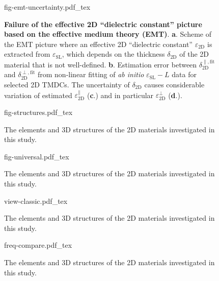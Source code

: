 \begin{figure}[!htbp]
  \centering
  {fig-emt-uncertainty.pdf_tex}
  \caption{\label{fig-emt}  \textbf{Failure of the effective 2D
      ``dielectric constant'' picture based on the effective medium
      theory (EMT)}. \textbf{a}.  Scheme of the EMT picture where an
    effective 2D ``dielectric constant'' $\varepsilon_{\mathrm{2D}}$
    is extracted from $\varepsilon_{\mathrm{SL}}$, which depends on
    the thickness $\delta_{\mathrm{2D}}$ of the 2D material that is
    not well-defined. \textbf{b}.  Estimation error between
    $\delta_{\mathrm{2D}}^{\parallel, \text{fit}}$ and
    $\delta_{\mathrm{2D}}^{\perp, \text{fit}}$ from non-linear fitting
    of \textit{ab initio} $\varepsilon_{\mathrm{SL}} - L$ data for selected
    2D TMDCs. The uncertainty of
    $\delta_{\mathrm{2D}}$ causes considerable variation of estimated
    $\varepsilon_{\mathrm{2D}}^{\parallel}$ (\textbf{c}.) and in
    particular $\varepsilon_{\mathrm{2D}}^{\perp}$ (\textbf{d}.).  }
\end{figure}

\begin{figure}[!htbp]
\centering
{fig-structures.pdf_tex}
\caption{\label{fig:diel-struct}
  The elements and 3D structures of the 2D
  materials investigated in this study.}
\end{figure}

\begin{figure}[!htbp]
\centering
{fig-universal.pdf_tex}
\caption{\label{fig:diel-universal}
  The elements and 3D structures of the 2D
  materials investigated in this study.}
\end{figure}

\begin{figure}[!htbp]
\centering
{view-classic.pdf_tex}
\caption{\label{fig:diel-classical}
  The elements and 3D structures of the 2D
  materials investigated in this study.}
\end{figure}

\begin{figure}[!htbp]
\centering
{freq-compare.pdf_tex}
\caption{\label{fig:diel-classical}
  The elements and 3D structures of the 2D
  materials investigated in this study.}
\end{figure}

